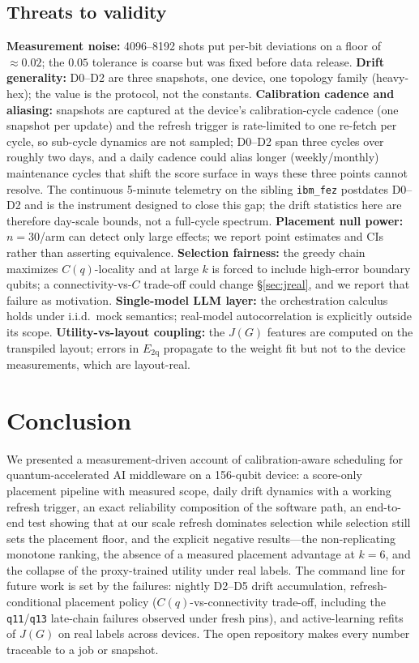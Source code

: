\documentclass[journal,10pt,twocolumn]{IEEEtran}
\newcommand{\q}[1]{\texttt{q#1}}
\begin{document}
\subsection{Threats to validity}
\textbf{Measurement noise:} 4096--8192 shots put per-bit deviations on a floor of $\approx0.02$; the $0.05$
tolerance is coarse but was fixed before data release. \textbf{Drift generality:} D0--D2 are three snapshots, one
device, one topology family (heavy-hex); the value is the protocol, not the constants. \textbf{Calibration cadence
and aliasing:} snapshots are captured at the device's calibration-cycle cadence (one snapshot per update) and the
refresh trigger is rate-limited to one re-fetch per cycle, so sub-cycle dynamics are not sampled; D0--D2 span three
cycles over roughly two days, and a daily cadence could alias longer (weekly/monthly) maintenance cycles that shift
the score surface in ways these three points cannot resolve. The continuous 5-minute telemetry on the sibling
\texttt{ibm\_fez} postdates D0--D2 and is the instrument designed to close this gap; the drift statistics here are
therefore day-scale bounds, not a full-cycle spectrum. \textbf{Placement null power:} $n{=}30$/arm can detect only
large effects; we report point estimates and CIs rather than asserting equivalence. \textbf{Selection fairness:} the greedy chain maximizes $C(q)$-locality and at large $k$ is forced to
include high-error boundary qubits; a connectivity-vs-$C$ trade-off could change \S\ref{sec:jreal}, and we report
that failure as motivation. \textbf{Single-model LLM layer:} the orchestration calculus holds under i.i.d.\ mock
semantics; real-model autocorrelation is explicitly outside its scope. \textbf{Utility-vs-layout coupling:} the
$J(G)$ features are computed on the transpiled layout; errors in $E_{\mathrm{2q}}$ propagate to the weight fit but
not to the device measurements, which are layout-real.

\section{Conclusion}
We presented a measurement-driven account of calibration-aware scheduling for quantum-accelerated AI middleware on
a 156-qubit device: a score-only placement pipeline with measured scope, daily drift dynamics with a working
refresh trigger, an exact reliability composition of the software path, an end-to-end test showing that at our
scale refresh dominates selection while selection still sets the placement floor, and the explicit negative
results---the non-replicating monotone ranking, the absence of a measured placement advantage at $k{=}6$, and the
collapse of the proxy-trained utility under real labels. The command line for future work is set by the failures:
nightly D2--D5 drift accumulation, refresh-conditional placement policy ($C(q)$-vs-connectivity trade-off, including
the \q{11}/\q{13} late-chain failures observed under fresh pins), and active-learning refits of $J(G)$ on real
labels across devices. The open repository makes every number traceable to a job or snapshot.
\end{document}
